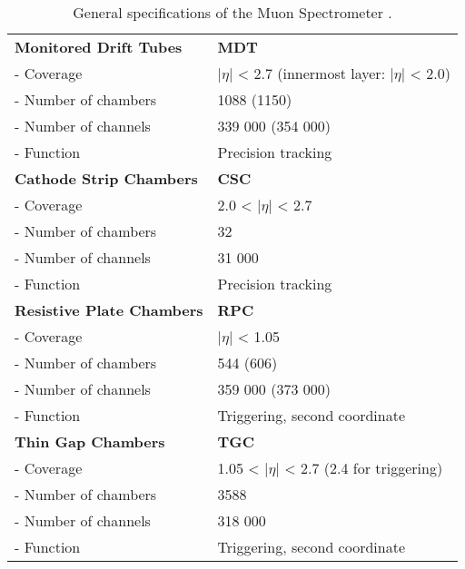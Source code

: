 \begin{table}[hb] \centering \scriptsize
\caption{General specifications of the Muon Spectrometer \cite{atlas_tdr}.}
\label{tab:muon_specs}
\begin{tabular}{|l|l|}
\hline
\textbf{Monitored Drift Tubes}    & \textbf{MDT}                                                      \\
- Coverage               & $|\eta|$ < 2.7 (innermost layer: $|\eta|$ < 2.0)         \\
- Number of chambers     & 1088 (1150)                                              \\
- Number of channels     & 339 000 (354 000)                                        \\
- Function               & Precision tracking                                       \\
\hline
\textbf{Cathode Strip Chambers}   & \textbf{CSC}                                                      \\
- Coverage               & 2.0 < $|\eta|$ < 2.7                                     \\
- Number of chambers     & 32                                                       \\
- Number of channels     & 31 000                                                   \\
- Function               & Precision tracking                                       \\
\hline
\textbf{Resistive Plate Chambers} & \textbf{RPC}                                                      \\
- Coverage               & $|\eta|$ < 1.05                                          \\
- Number of chambers     & 544 (606)                                                \\
- Number of channels     & 359 000 (373 000)                                        \\
- Function               & Triggering, second coordinate                            \\
\hline
\textbf{Thin Gap Chambers}        & \textbf{TGC}                                                      \\
- Coverage               & 1.05 < $|\eta|$ < 2.7 (2.4 for triggering)               \\
- Number of chambers     & 3588                                                     \\
- Number of channels     & 318 000                                                  \\
- Function               & Triggering, second coordinate                            \\
\hline
\end{tabular} \end{table}

